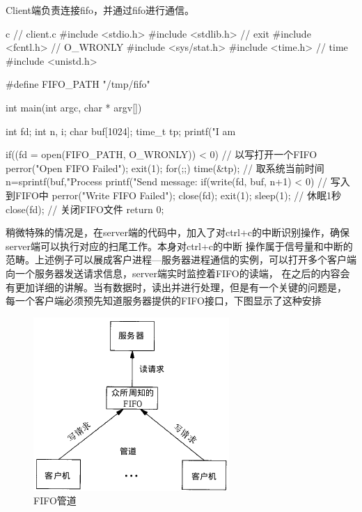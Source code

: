 Client端负责连接fifo，并通过fifo进行通信。
\begin{code-block}{c}
// client.c
#include <stdio.h>
#include <stdlib.h>   // exit
#include <fcntl.h>    // O_WRONLY
#include <sys/stat.h>
#include <time.h>     // time
#include <unistd.h>

#define FIFO_PATH "/tmp/fifo"

int main(int argc, char * argv[])
{
        int fd;
        int n, i;
        char buf[1024];
        time_t tp;
        printf("I am %

        if((fd = open(FIFO_PATH, O_WRONLY)) < 0) // 以写打开一个FIFO
        {
                perror("Open FIFO Failed");
                exit(1);
        }
        for(;;)
        {
                time(&tp);  // 取系统当前时间
                n=sprintf(buf,"Process %
                printf("Send message: %
                if(write(fd, buf, n+1) < 0)  // 写入到FIFO中
                {
                        perror("Write FIFO Failed");
                        close(fd);
                        exit(1);
                }
                sleep(1);  // 休眠1秒
        }
        close(fd);  // 关闭FIFO文件
        return 0;
}
\end{code-block}

稍微特殊的情况是，在server端的代码中，加入了对ctrl+c的中断识别操作，确保server端可以执行对应的扫尾工作。本身对ctrl+c的中断
操作属于信号量和中断的范畴。上述例子可以展成客户进程—服务器进程通信的实例，可以打开多个客户端
向一个服务器发送请求信息，server端实时监控着FIFO的读端，
在之后的内容会有更加详细的讲解。当有数据时，读出并进行处理，但是有一个关键的问题是，
每一个客户端必须预先知道服务器提供的FIFO接口，下图显示了这种安排
\begin{figure}[H]
  \centering
  \includegraphics[scale=0.6]{fifo.png}
  \caption{FIFO管道}
  \label{fig:fifo}
\end{figure}

